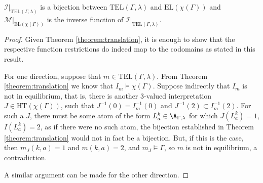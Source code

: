 \begin{corollary}\label{cor:bijection-of-sm}
  $\mathcal{I}\vert_{\text{TEL}(\Gamma,\lambda)}$ is a bijection
  between $\text{TEL}(\Gamma,\lambda)$ and $\text{EL}(\chi(\Gamma))$
  and $\mathcal{M}\vert_{\text{EL}(\chi(\Gamma))}$ is the inverse
  function of $\mathcal{I}\vert_{\text{TEL}(\Gamma,\lambda)}$.
\end{corollary}

\begin{proof}
  Given Theorem \ref{theorem:translation}, it is enough to show that
  the respective function restrictions do indeed map to the codomains
  as stated in this result.

  For one direction, suppose that $m \in
  \text{TEL}(\Gamma,\lambda)$. From Theorem \ref{theorem:translation}
  we know that $I_m \models \chi(\Gamma)$. Suppose indirectly that
  $I_m$ is not in equilibrium, that is, there is another 3-valued
  interpretation $J \in \text{HT}(\chi(\Gamma))$, such that
  $J^{-1}(0) = I_m^{-1}(0)$ and $J^{-1}(2) \subset I_m^{-1}(2)$. For
  such a $J$, there must be some atom of the form
  $L_{a}^k \in \A_{\Gamma,\lambda}$ for which $J(L_{a}^k)=1$,
  $I(L_a^k)=2$, as if there were no such atom, the bijection
  established in Theorem \ref{theorem:translation} would not in fact
  be a bijection. But, if this is the case, then $m_J(k,a) = 1$ and
  $m(k,a) = 2$, and $m_J \models \Gamma$, so $m$ is not in
  equilibrium, a contradiction.

  A similar argument can be made for the other direction.
\end{proof}

